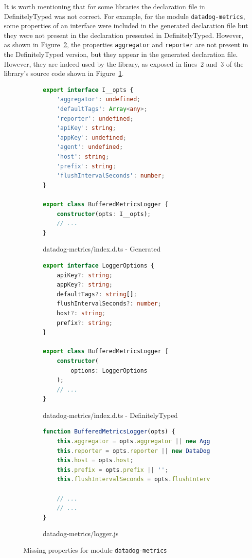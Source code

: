 \documentclass[a4paper,english,cleveref, autoref]{lipics-v2019}
\newcommand{\figref}[1]{Figure~\ref{#1}}
\begin{document}
It is worth mentioning that for some libraries the declaration file in
DefinitelyTyped was not correct. For example, for the module
\texttt{datadog-metrics}, some properties of an interface were
included in the generated declaration file but they were not present
in the declaration presented in DefinitelyTyped. However, as shown in
\figref{fig:experiments-results-module-datadog-metrics}, the
properties \texttt{aggregator} and \texttt{reporter} are not present
in the DefinitelyTyped version, but they appear in the generated
declaration file. However, they are indeed used by the library, as
exposed in lines~2 and~3 of the library's source code shown in
\figref{fig:subfloat-datadog-logger}. 
\begin{figure}[tp]
    \centering
    \begin{subfigure}{0.48\linewidth}
      \begin{lstlisting}[language=TypeScript]
export interface I__opts {
    'aggregator': undefined;
    'defaultTags': Array<any>;
    'reporter': undefined;
    'apiKey': string;
    'appKey': undefined;
    'agent': undefined;
    'host': string;
    'prefix': string;
    'flushIntervalSeconds': number;
}

export class BufferedMetricsLogger {
    constructor(opts: I__opts);
    // ...
}
      \end{lstlisting}
      \caption{datadog-metrics/index.d.ts - Generated}
    \end{subfigure}
    \hfill
    \begin{subfigure}{0.48\linewidth}
      \begin{lstlisting}[language=TypeScript]
export interface LoggerOptions {
    apiKey?: string;
    appKey?: string;
    defaultTags?: string[];
    flushIntervalSeconds?: number;
    host?: string;
    prefix?: string;
}

export class BufferedMetricsLogger {
    constructor(
        options: LoggerOptions
    );
    // ...
}
      \end{lstlisting}
      \caption{datadog-metrics/index.d.ts - DefinitelyTyped}
    \end{subfigure}

    \begin{subfigure}{0.80\linewidth}
        \begin{lstlisting}[language=TypeScript]
function BufferedMetricsLogger(opts) {
    this.aggregator = opts.aggregator || new Aggregator(opts.defaultTags);
    this.reporter = opts.reporter || new DataDogReporter(opts.apiKey, opts.appKey, opts.agent);
    this.host = opts.host;
    this.prefix = opts.prefix || '';
    this.flushIntervalSeconds = opts.flushIntervalSeconds;

    // ...
    // ...
}
        \end{lstlisting}
        \caption{datadog-metrics/logger.js}
        \label{fig:subfloat-datadog-logger}
      \end{subfigure}

    \caption{Missing properties for module \texttt{datadog-metrics}}
    \label{fig:experiments-results-module-datadog-metrics}
\end{figure}
\end{document}
